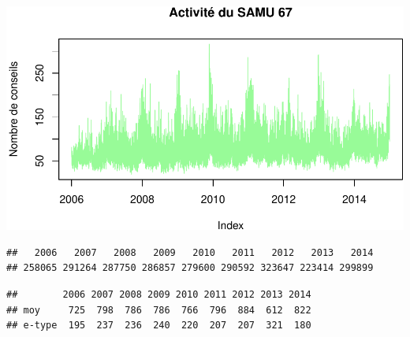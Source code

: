 \documentclass[]{article}
\newenvironment{Shaded}{\begin{snugshade}}{\end{snugshade}}
\newcommand{\KeywordTok}[1]{\textcolor[rgb]{0.13,0.29,0.53}{\textbf{{#1}}}}
\newcommand{\StringTok}[1]{\textcolor[rgb]{0.31,0.60,0.02}{{#1}}}
\newcommand{\CommentTok}[1]{\textcolor[rgb]{0.56,0.35,0.01}{\textit{{#1}}}}
\newcommand{\NormalTok}[1]{{#1}}
\begin{document}
\includegraphics{samu_files/figure-latex/samu67-2.pdf}

\begin{Shaded}
\end{Shaded}

\begin{verbatim}
##   2006   2007   2008   2009   2010   2011   2012   2013   2014 
## 258065 291264 287750 286857 279600 290592 323647 223414 299899
\end{verbatim}

\begin{Shaded}
\end{Shaded}

\begin{verbatim}
##        2006 2007 2008 2009 2010 2011 2012 2013 2014
## moy     725  798  786  786  766  796  884  612  822
## e-type  195  237  236  240  220  207  207  321  180
\end{verbatim}
\end{document}
